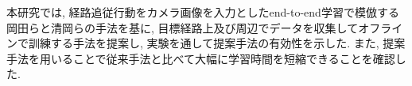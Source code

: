 
本研究では, 経路追従行動をカメラ画像を入力としたend-to-end学習で模倣する岡田ら\cite{okada-si2020}と清岡ら\cite{kiyooka-si}の手法を基に, 目標経路上及び周辺でデータを収集してオフラインで訓練する手法を提案し, 実験を通して提案手法の有効性を示した. また, 提案手法を用いることで従来手法と比べて大幅に学習時間を短縮できることを確認した.  